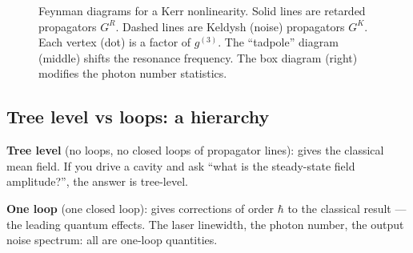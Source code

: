 \documentclass[12pt]{article}
\begin{document}
\begin{figure}[h]
\centering
{}
\caption{Feynman diagrams for a Kerr nonlinearity.  Solid lines are
retarded propagators $G^R$.  Dashed lines are Keldysh (noise)
propagators $G^K$.  Each vertex (dot) is a factor of $g^{(3)}$.
The ``tadpole'' diagram (middle) shifts the resonance frequency.
The box diagram (right) modifies the photon number statistics.}
\end{figure}

\subsection{Tree level vs loops: a hierarchy}

\textbf{Tree level} (no loops, no closed loops of propagator lines):
gives the classical mean field. If you drive a cavity and ask ``what
is the steady-state field amplitude?'', the answer is tree-level.

\textbf{One loop} (one closed loop): gives corrections of order
$\hbar$ to the classical result --- the leading quantum effects.
The laser linewidth, the photon number, the output noise spectrum:
all are one-loop quantities.
\end{document}
